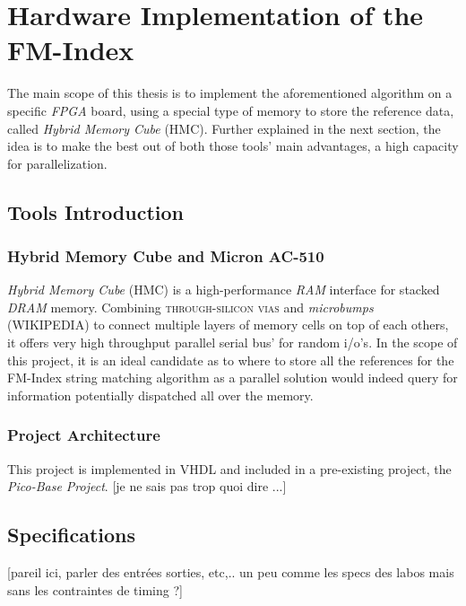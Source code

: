 
\chapter{Hardware Implementation of the FM-Index} %

\label{Chapter3} %
The main scope of this thesis is to implement the aforementioned algorithm on a specific \textsl{FPGA} board, using a special type of memory to store the reference data, called \textsl{Hybrid Memory Cube} (HMC). Further explained in the next section, the idea is to make the best out of both those tools' main advantages, a high capacity for parallelization.


\section{Tools Introduction}

\subsection{Hybrid Memory Cube and Micron AC-510}


\textsl{Hybrid Memory Cube} (HMC) is a high-performance \textsl{RAM} interface for stacked \textsl{DRAM} memory. Combining \textsc{through-silicon vias} and \textsl{microbumps} (WIKIPEDIA) to connect multiple layers of memory cells on top of each others, it offers very high throughput parallel serial bus' for random i/o's. In the scope of this project, it is an ideal candidate as to where to store all the references for the  FM-Index string matching algorithm as a parallel solution would indeed query for information potentially dispatched all over the memory.


\subsection{Project Architecture}

This project is implemented in VHDL and included in a pre-existing project, the \textsl{Pico-Base Project}. [je ne sais pas trop quoi dire ...]

\section{Specifications}

[pareil ici, parler des entrées sorties, etc,.. un peu comme les specs des labos mais sans les contraintes de timing ?]

